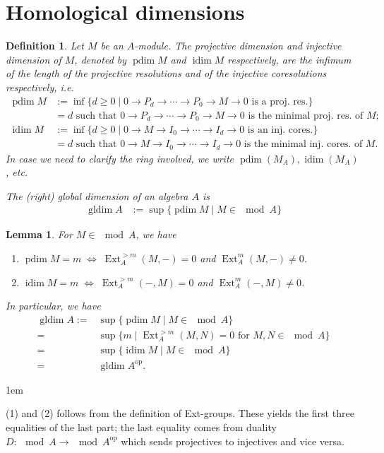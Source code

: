 \documentclass[11pt,a4paper]{article}
\makeatletter
\numberwithin{equation}{section}
\renewenvironment{proof}[1][\proofname]{\par
    \pushQED{\qed}%
    \normalfont \topsep0\p@\@plus6\p@ \labelsep1em\relax
    \trivlist
    \item[\hskip\labelsep\indent
        \bfseries #1]\ignorespaces
    \mbox{}
}{
    \popQED\endtrivlist\@endpefalse
}
\theoremstyle{all}
\newtheorem{lemma}[theorem]{Lemma}
\newtheorem{definition}[theorem]{Definition}
\theoremstyle{remark}
\newcommand{\Ext}{\operatorname{Ext}\nolimits}
\newcommand{\op}{\mathrm{op}}
\newcommand{\pdim}{\operatorname{pdim}}
\newcommand{\idim}{\operatorname{idim}}
\newcommand{\gldim}{\operatorname{gldim}\nolimits}
\newcommand{\defn}[1]{\textsl{\color{darkblue} #1}}
\makeatother
\begin{document}
\pagebreak

\section{Homological dimensions}

\begin{definition}
Let $M$ be an $A$-module.
The \defn{projective dimension} and \defn{injective dimension} of $M$, denoted by $\pdim M$ and $\idim M$ respectively, are the infimum of the length of the projective resolutions and of the injective coresolutions respectively, i.e.
\begin{align*}
\pdim M & := \inf\{d\geq 0\mid 0\to P_d\to \cdots \to P_0\to M\to 0 \text{ is a proj. res.}\}\\
& = d \text{ such that } 0\to P_d\to \cdots \to P_0\to M\to 0 \text{ is the minimal proj. res. of }M;\\
\idim M & := \inf\{d\geq 0\mid 0\to M\to I_0\to \cdots \to I_d\to 0 \text{ is an inj. cores.}\}\\
& = d \text{ such that } 0\to M\to I_0\to \cdots \to I_d\to 0 \text{ is the minimal inj. cores. of }M.
\end{align*}
In case we need to clarify the ring involved, we write $\pdim(M_A), \idim(M_A)$, etc.

The (right) \defn{global dimension} of an algebra $A$ is 
\begin{align*}
\gldim A & := \sup \{ \pdim M \mid M\in \mod A \}
\end{align*}
\end{definition}


\begin{lemma}\label{lem:Ext vanishing pdim}
For $M\in\mod A$, we have
\begin{enumerate}
\item $\pdim M=m \;\Leftrightarrow \; \Ext_A^{>m}(M,-)=0$ and $\Ext_A^m(M,-)\neq 0$.
\item $\idim M=m \;\Leftrightarrow \; \Ext_A^{>m}(-,M)=0$ and $\Ext_A^m(-,M)\neq 0$.
\end{enumerate}
In particular, we have
\begin{align*}
\gldim A := & \sup\{\pdim M\mid M\in \mod A\} \\
 =& \sup\{m\mid \Ext_A^{>m}(M,N)=0 \text{ for } M,N\in\mod A\}\\
 =& \sup\{\idim M\mid M\in \mod A\}\\
 =& \gldim A^\op.
\end{align*}
\end{lemma}
\begin{proof}
(1) and (2) follows from the definition of Ext-groups.  These yields the first three equalities of the last part; the last equality comes from duality $D:\mod A\to \mod A^\op$ which sends projectives to injectives and vice versa.
\end{proof}
\end{document}

